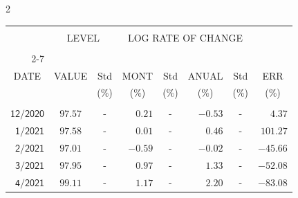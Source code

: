 \begin{multicols}{2}{ 
\begin{tabular}{rccrcrcr} 
\hline 
 \multicolumn{1}{|c|}{}  &  \multicolumn{2}{c|}{} & 
\multicolumn{4}{c}{} & \multicolumn{1}{|c|}{}\vspace{-.10in}\\ 
\multicolumn{1}{|c|}{}  &  \multicolumn{2}{c|}{LEVEL} & 
\multicolumn{4}{c}{LOG RATE OF CHANGE} & \multicolumn{1}{|c|}{}    \\  
\multicolumn{1}{|c|}{}  &  \multicolumn{2}{c|}{} & 
\multicolumn{4}{c}{} & \multicolumn{1}{|c|}{}\vspace{-.10in}\\ \cline{2-7} 
\multicolumn{1}{|c|}{ } &\multicolumn{1}{c|}{ } & \multicolumn{1}{c|}{} & \multicolumn{1}{c|}{} & \multicolumn{1}{c|}{}     & \multicolumn{1}{c|}{} & \multicolumn{1}{c|}{}  & \multicolumn{1}{c|}{}  \vspace{-.05in}\\  
\multicolumn{1}{|c|}{DATE } &\multicolumn{1}{c|}{ VALUE} & \multicolumn{1}{c|}{Std} & \multicolumn{1}{c|}{MONT} & \multicolumn{1}{c|}{Std}     & \multicolumn{1}{c|}{ANUAL} & \multicolumn{1}{c|}{Std}  & \multicolumn{1}{c|}{ERR}\\  
\multicolumn{1}{|c|}{ }      & \multicolumn{1}{c|}{  }    & \multicolumn{1}{c|}{($\%$)}&  \multicolumn{1}{c|}{($\%$)  }  & \multicolumn{1}{c|}{($\%$)} & \multicolumn{1}{c|}{($\%$) }     & \multicolumn{1}{c|}{ ($\%$) }  &  \multicolumn{1}{c|}{ ($\%$) } \\  
 \hline 
 \\$\mathsf{      12/2020}$ &$\mathsf{    97.57}$ &     - &$\mathsf{    0.21}$ &     - &$\mathsf{    -0.53 }$ &     - &$\mathsf{   4.37} $ \vspace{-.005in}\\ 
$\mathsf{       1/2021}$ &$\mathsf{    97.58}$ &     - &$\mathsf{    0.01}$ &     - &$\mathsf{     0.46 }$ &     - &$\mathsf{ 101.27} $ \vspace{-.005in}\\ 
$\mathsf{       2/2021}$ &$\mathsf{    97.01}$ &     - &$\mathsf{   -0.59}$ &     - &$\mathsf{    -0.02 }$ &     - &$\mathsf{ -45.66} $ \vspace{-.005in}\\ 
$\mathsf{       3/2021}$ &$\mathsf{    97.95}$ &     - &$\mathsf{    0.97}$ &     - &$\mathsf{     1.33 }$ &     - &$\mathsf{ -52.08} $ \vspace{-.005in}\\ 
$\mathsf{       4/2021}$ &$\mathsf{    99.11}$ &     - &$\mathsf{    1.17}$ &     - &$\mathsf{     2.20 }$ &     - &$\mathsf{ -83.08} $ \vspace{-.005in}\\ 

\end{tabular}}
\end{multicols}
